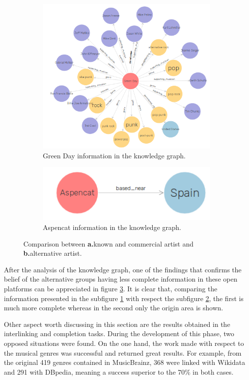 \begin{figure}[!tbh]
	\centering
	\begin{subfigure}{0.65\columnwidth}
		\centering
		\includegraphics[width=0.7\linewidth]{images/greenday.png}
		\caption{Green Day information in the knowledge graph.}
		\label{subfig:green_day}
	\end{subfigure}
	\begin{subfigure}{0.30\columnwidth}
		\centering
		\includegraphics[width=0.63\linewidth]{images/aspencat.png}
		\caption{Aspencat information in the knowledge graph.}
		\label{subfig:aspencat}
	\end{subfigure}

	\caption{Comparison between \textbf{a.}known and commercial artist and \textbf{b.}alternative artist.}
	\label{fig:graph-comp}
\end{figure}

After the analysis of the knowledge graph, one of the findings that confirms the belief of the alternative groups having less complete information in these open platforms can be appreciated in figure \ref{fig:graph-comp}.
It is clear that, comparing the information presented in the subfigure \ref{subfig:green_day} with respect the subfigure \ref{subfig:aspencat}, the first is much more complete whereas in the second only the origin area is shown. 

Other aspect worth discussing in this section are the results obtained in the interlinking and completion tasks.
During the development of this phase, two opposed situations were found.
On the one hand, the work made with respect to the musical genres was successful and returned great results.
For example, from the original 419 genres contained in MusicBrainz, 368 were linked with Wikidata and 291 with DBpedia, meaning a success superior to the 70\% in both cases.

